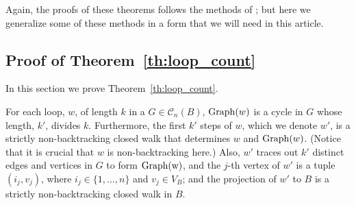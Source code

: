 \documentclass{memo-l}
\theoremstyle{plain}
\theoremstyle{definition}
\numberwithin{section}{chapter}
\numberwithin{equation}{chapter}
\theoremstyle{plain}
\theoremstyle{definition}
\newcommand\cC{\mathcal{C}}
\begin{document}
Again, the proofs of these theorems 
follows the methods of \cite{friedman_relative}; but here we 
generalize some of these methods in a form that we will need in
this article.

\subsection{Proof of Theorem~\ref{th:loop_count}}
\label{sb:loop_count_proof}

In this section we prove Theorem~\ref{th:loop_count}.

For each loop, $w$, of length $k$
in a $G\in\cC_n(B)$, ${\rm Graph}(w)$ is a cycle in $G$ whose
length, $k'$, divides $k$.  Furthermore, the first $k'$ steps of $w$,
which we denote $w'$,
is a strictly non-backtracking closed walk that determines $w$ and
${\rm Graph}(w)$.  (Notice that it is crucial that $w$ is non-backtracking
here.)
Also, $w'$ traces out $k'$ distinct edges and vertices in $G$ to form
${\rm Graph(w)}$, and the $j$-th vertex of $w'$ is a tuple $(i_j,v_j)$, where
$i_j\in \{1,\ldots,n\}$ and $v_j\in V_B$; and the projection of $w'$ to
$B$ is a strictly non-backtracking closed walk in $B$.
\end{document}
